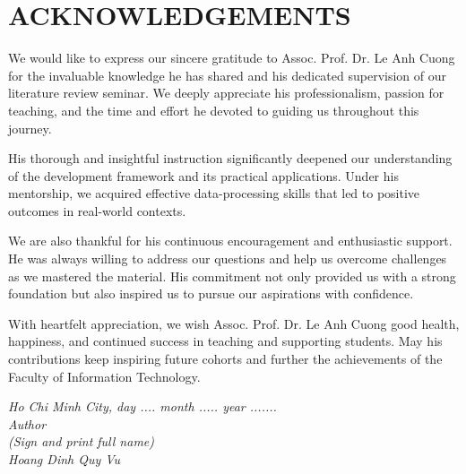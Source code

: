 \chapter*{ACKNOWLEDGEMENTS}
We would like to express our sincere gratitude to Assoc. Prof. Dr. Le Anh Cuong for the invaluable knowledge he has shared and his dedicated supervision of our literature review seminar. We deeply appreciate his professionalism, passion for teaching, and the time and effort he devoted to guiding us throughout this journey.

His thorough and insightful instruction significantly deepened our understanding of the development framework and its practical applications. Under his mentorship, we acquired effective data-processing skills that led to positive outcomes in real-world contexts.

We are also thankful for his continuous encouragement and enthusiastic support. He was always willing to address our questions and help us overcome challenges as we mastered the material. His commitment not only provided us with a strong foundation but also inspired us to pursue our aspirations with confidence.

With heartfelt appreciation, we wish Assoc. Prof. Dr. Le Anh Cuong good health, happiness, and continued success in teaching and supporting students. May his contributions keep inspiring future cohorts and further the achievements of the Faculty of Information Technology.

\vspace*{1cm}
\begin{flushright}
	\begin{minipage}{8.75cm}
		\centering\itshape
		Ho Chi Minh City, day .... month .....  year .......\\
		Author\\[3cm]
		(Sign and print full name)\\
		Hoang Dinh Quy Vu
	\end{minipage}
\end{flushright}
\newpage